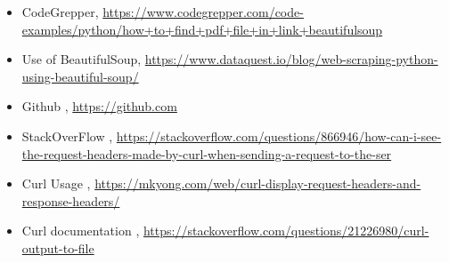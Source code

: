 \documentclass[12pt]{article}
\begin{document}
\begin{itemize}
    \item {CodeGrepper, \url{https://www.codegrepper.com/code-examples/python/how+to+find+pdf+file+in+link+beautifulsoup}}
    \item {Use of BeautifulSoup, \url{https://www.dataquest.io/blog/web-scraping-python-using-beautiful-soup/}}
    \item {Github , \url{https://github.com}}
    \item {StackOverFlow , \url{https://stackoverflow.com/questions/866946/how-can-i-see-the-request-headers-made-by-curl-when-sending-a-request-to-the-ser}}
    \item {Curl Usage , \url{https://mkyong.com/web/curl-display-request-headers-and-response-headers/}}
    \item {Curl documentation , \url{https://stackoverflow.com/questions/21226980/curl-output-to-file}}
\end{itemize}
\end{document}
